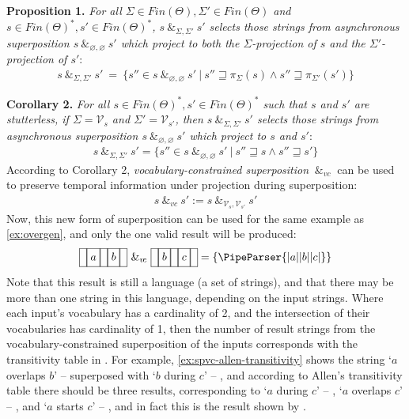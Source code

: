 \documentclass[a4paper,12pt,leqno]{article}
\newcommand{\vph}[1]{\vphantom{#1}}
\newcommand{\ebox}[1]{\fbox{$\vph{'(),}#1$}}
\newcommand{\nbBefore}[2]{\ebox{#1}\ebox{}\ebox{#2}}
\newcommand{\nbOverlaps}[2]{\ebox{#1}\ebox{#1,#2}\ebox{#2}}
\newcommand{\nbDuring}[2]{\ebox{#2}\ebox{#1,#2}\ebox{#2}}
\newcommand{\nbStarts}[2]{\ebox{#1,#2}\ebox{#2}}
\newcommand{\Before}[2]{\ebox{}\nbBefore{#1}{#2}\ebox{}}
\newcommand{\Overlaps}[2]{\ebox{}\nbOverlaps{#1}{#2}\ebox{}}
\newcommand{\During}[2]{\ebox{}\nbDuring{#1}{#2}\ebox{}}
\newcommand{\Starts}[2]{\ebox{}\nbStarts{#1}{#2}\ebox{}}
\newcommand{\cOverlaps}[2]{`$#1$ overlaps $#2$' -- \Overlaps{#1}{#2}}
\newcommand{\cDuring}[2]{`$#1$ during $#2$' -- \During{#1}{#2}}
\newcommand{\cStarts}[2]{`$#1$ starts $#2$' -- \Starts{#1}{#2}}
\newcommand{\spsigma}[1][\Sigma, \Sigma']{~\&_{#1}~}
\newcommand{\spvc}{~\&_{v\!c}~}
\newcommand{\V}{\mathcal{V}}
\renewcommand{\emptyset}{\varnothing}
\newcommand{\EventString}[1]{%
	\renewcommand*{\do}[1]{\ebox{##1}}%
	\PipeParser{#1}%
}
\begin{document}
\noindent
\textbf{Proposition 1.} {\sl For all $\Sigma \in Fin(\Theta), \Sigma' \in Fin(\Theta)$ and $s \in Fin(\Theta)^*, s' \in Fin(\Theta)^*$, $s \spsigma s'$ selects those strings from asynchronous superposition $s \spsigma[\emptyset, \emptyset] s'$ which project to both the $\Sigma$-projection of $s$ and the $\Sigma'$-projection of $s'$}:
\begin{align}
s \spsigma s' ~=~ \{s'' \in s \spsigma[\emptyset, \emptyset] s' ~|~
s'' \sqsupseteq \pi_{\Sigma}(s) \wedge s'' \sqsupseteq \pi_{\Sigma'}(s')\}
\end{align}

\noindent
\textbf{Corollary 2.} {\sl For all $s \in Fin(\Theta)^*, s' \in Fin(\Theta)^*$ such that $s$ and $s'$ are stutterless, if $\Sigma = \V_s$ and $\Sigma' =\V_{s'}$, then $s \spsigma s'$ selects those strings from asynchronous superposition $s \spsigma[\emptyset, \emptyset] s'$ which project to $s$ and $s'$}:
\begin{align}
s \spsigma s' = \{s''\in s \spsigma[\emptyset, \emptyset] s' ~|~ s'' \sqsupseteq s \wedge s'' \sqsupseteq s'\}
\end{align}
\doublespacing
According to Corollary 2, \textit{vocabulary-constrained superposition} $\spvc$ can be used to preserve temporal information under projection during superposition:
\begin{align}\label{def:vc-superposition}
s \spvc s' :=  s \spsigma[\V_s, \V_{s'}] s'
\end{align}
Now, this new form of superposition can be used for the same example as \cref{ex:overgen}, and only the one valid result will be produced:
\begin{align}
	\Before{a}{b} \spvc \Before{b}{c} = \{\EventString{{}|a|{}|b|{}|c|{}}\}
\end{align}
Note that this result is still a language (a set of strings), and that there may be more than one string in this language, depending on the input strings. Where each input's vocabulary has a cardinality of 2, and the intersection of their vocabularies has cardinality of 1, then the number of result strings from the vocabulary-constrained superposition of the inputs corresponds with the transitivity table in \citet[Fig. 4]{allen1983maintaining}. For example, \cref{ex:spvc-allen-transitivity} shows the string \cOverlaps{a}{b} superposed with \cDuring{b}{c}, and according to Allen's transitivity table there should be three results, corresponding to \cDuring{a}{c}, \cOverlaps{a}{c}, and \cStarts{a}{c}, and in fact this is the result shown by .
\end{document}
